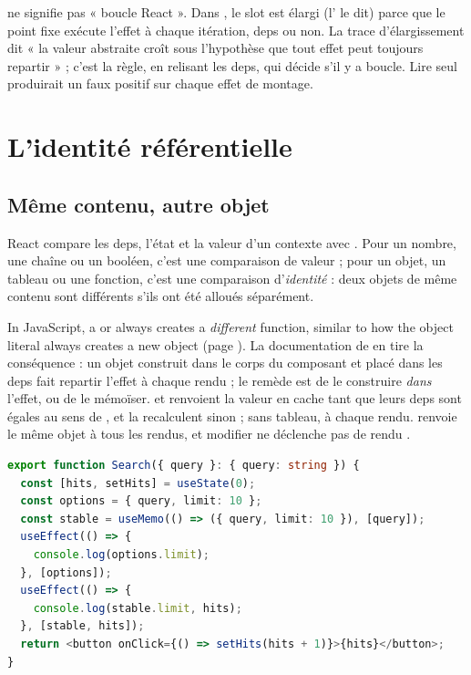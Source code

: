 \begin{piege}
 ne signifie pas « boucle React ». Dans , le
slot est élargi (l'\Info{}  le dit) parce que le point fixe
exécute l'effet à chaque itération, deps \code{[]} ou non. La trace
d'élargissement dit « la valeur abstraite croît sous l'hypothèse que tout effet
peut toujours repartir » ; c'est la règle, en relisant les deps, qui décide
s'il y a boucle. Lire  seul produirait un faux positif sur
chaque effet de montage.
\end{piege}

\section{L'identité référentielle}
\label{sec:react-modele-identite}

\subsection{Même contenu, autre objet}

React compare les deps, l'état et la valeur d'un contexte avec
. Pour un nombre, une chaîne ou un booléen, c'est une
comparaison de valeur ; pour un objet, un tableau ou une fonction, c'est une
comparaison d'\emph{identité} : deux objets de même contenu sont différents
s'ils ont été alloués séparément.

\begin{react}
\og In JavaScript, a  or \code{() => {}} always creates
a \emph{different} function, similar to how the \code{{}} object literal always
creates a new object\fg{} (page ). La documentation de
 en tire la conséquence : un objet construit dans le corps du
composant et placé dans les deps fait repartir l'effet à chaque rendu ; le
remède est de le construire \emph{dans} l'effet, ou de le mémoïser.
 et  renvoient la valeur en cache tant que
leurs deps sont égales au sens de , et la recalculent sinon ;
sans tableau, à chaque rendu.  renvoie le même objet à tous les
rendus, et modifier  ne déclenche pas de rendu
\cite{ReactDocs}.
\end{react}

\begin{lstlisting}[language=TypeScript,caption={\code{Search} : une dep fraîche à chaque rendu, et sa version mémoïsée (\file{/tmp/ch02/search.tsx}, imports omis)},label={lst:react-modele-search}]
export function Search({ query }: { query: string }) {
  const [hits, setHits] = useState(0);
  const options = { query, limit: 10 };
  const stable = useMemo(() => ({ query, limit: 10 }), [query]);
  useEffect(() => {
    console.log(options.limit);
  }, [options]);
  useEffect(() => {
    console.log(stable.limit, hits);
  }, [stable, hits]);
  return <button onClick={() => setHits(hits + 1)}>{hits}</button>;
}
\end{lstlisting}

